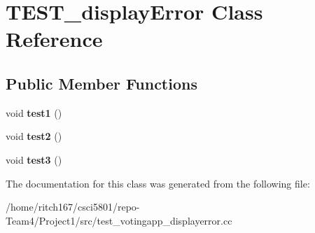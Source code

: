 \hypertarget{classTEST__displayError}{}\section{T\+E\+S\+T\+\_\+display\+Error Class Reference}
\label{classTEST__displayError}
\subsection*{Public Member Functions}
\begin{DoxyCompactItemize}
\item 
\mbox{\label{classTEST__displayError_aaba96de074b8da42c95607bf73fc5bdf}} 
void {\bfseries test1} ()
\item 
\mbox{\label{classTEST__displayError_a305da9a3ed87892030b587e0a46d4e5d}} 
void {\bfseries test2} ()
\item 
\mbox{\label{classTEST__displayError_a109491ac20d5f5b83542c086fd3b352f}} 
void {\bfseries test3} ()
\end{DoxyCompactItemize}


The documentation for this class was generated from the following file\+:\begin{DoxyCompactItemize}
\item 
/home/ritch167/csci5801/repo-\/\+Team4/\+Project1/src/test\+\_\+votingapp\+\_\+displayerror.\+cc\end{DoxyCompactItemize}
